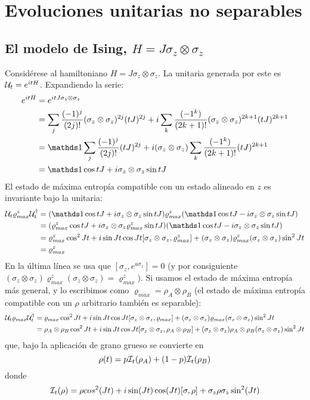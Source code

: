\section{Evoluciones unitarias no separables}
\subsection{El modelo de Ising, $H=J\sigma_{z}\otimes\sigma_{z}$}\label{sec:Ising}
Considérese al hamiltoniano $H=J\sigma_{z}\otimes\sigma_{z}$. La unitaria generada por este es $\mathcal{U}_{t}=e^{itH}$. Expandiendo la serie:
\begin{align*}
    e^{itH}&=e^{itJ\sigma_{z}\otimes\sigma_{z}}\\
    &=\sum_{j}\frac{(-1)^{j}}{(2j)!}(\sigma_{z}\otimes\sigma_{z})^{2j}(tJ)^{2j}+i\sum_{k}\frac{(-1^{k})}{(2k+1)!}(\sigma_{z}\otimes\sigma_{z})^{2k+1}(tJ)^{2k+1}\\
    &=\Id\sum_{j}\frac{(-1)^{j}}{(2j)!}(tJ)^{2j}+i(\sigma_{z}\otimes\sigma_{z})\sum_{k}\frac{(-1^{k})}{(2k+1)!}(tJ)^{2k+1}\\
    &=\Id \cos{tJ} + i\sigma_{z}\otimes\sigma_{z}\sin{tJ}
\end{align*}
El estado de máxima entropía compatible con un estado alineado en $z$ es invariante bajo la unitaria:
\begin{align*}
    \mcU_{t}\varrho_{max}^{z}\mcU_{t}^{\dag}&=(\Id \cos{tJ} + i\sigma_{z}\otimes\sigma_{z}\sin{tJ})\varrho_{max}^{z}(\Id \cos{tJ} - i\sigma_{z}\otimes\sigma_{z}\sin{tJ})\\
    &=(\varrho_{max}^{z} \cos{tJ} + i\sigma_{z}\otimes\sigma_{z}\varrho_{max}^{z}\sin{tJ})(\Id \cos{tJ} - i\sigma_{z}\otimes\sigma_{z}\sin{tJ})\\
    &=\varrho_{max}^{z} \cos^{2}{Jt}+i\sin{Jt}\cos{Jt}[\sigma_{z}\otimes\sigma_{z},\varrho_{max}^{z}]+(\sigma_{z}\otimes\sigma_{z}) \varrho_{max}^{z} (\sigma_{z}\otimes\sigma_{z}) \sin^{2}{Jt}\\
    &=\varrho_{max}^{z}
\end{align*}
En la última línea se usa que $[\sigma_{z},e^{a\sigma_{z}}]=0$ (y por consiguiente $(\sigma_{z}\otimes\sigma_{z}) \varrho_{max}^{z} (\sigma_{z}\otimes\sigma_{z})=\varrho_{max}^{z}$). Si usamos el estado de máxima entropía más general, y lo escribimos como $\varrho_{max}=\rho_{A}\otimes\rho_{B}$ (el estado de máxima entropía compatible con un $\rho$ arbitrario también es separable):
\begin{align*}
    \mathcal{U}_{t}\varrho_{max}\mathcal{U}_{t}^{\dag}&=\varrho_{max}\cos^{2}{Jt}+i\sin{Jt}\cos{Jt}[\sigma_{z}\otimes\sigma_{z},\varrho_{max}]+(\sigma_{z}\otimes\sigma_{z}) \varrho_{max} (\sigma_{z}\otimes\sigma_{z}) \sin^{2}{Jt}\\
    &=\rho_{A}\otimes\rho_{B}\cos^{2}{Jt}+i\sin{Jt}\cos{Jt}[\sigma_{z}\otimes\sigma_{z},\rho_{A}\otimes\rho_{B}]+(\sigma_{z}\otimes\sigma_{z}) \rho_{A}\otimes\rho_{B} (\sigma_{z}\otimes\sigma_{z}) \sin^{2}{Jt}\\
\end{align*}
que, bajo la aplicación de grano grueso se convierte en
\begin{equation}
    \rho(t)=p\mathcal{I}_{t}(\rho_{A})+(1-p)\mathcal{I}_{t}(\rho_{B})
\end{equation}
donde 
\begin{equation}
    \mathcal{I}_{t}(\rho)=\rho cos^{2}(Jt)+i\sin(Jt)\cos(Jt)[\sigma,\rho]+\sigma_{z}\rho\sigma_{z}\sin^{2}(Jt)
\end{equation}
\newpage